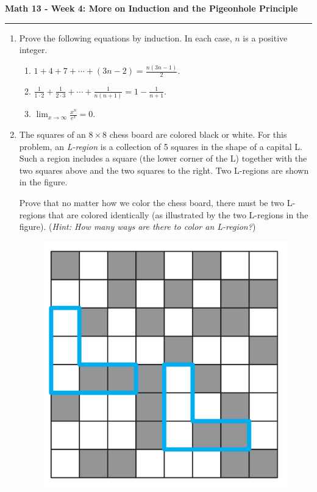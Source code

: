 \documentclass[12pt]{report}
\theoremstyle{definition}
\begin{document}
\begin{center}
{\bf \Large Math 13 - Week 4: More on Induction and the Pigeonhole Principle}
\vspace{0.2cm}
\hrule
\end{center}

\begin{enumerate}	

\item Prove the following equations by induction. In each case, $n$ is a positive integer.
\begin{enumerate}
	\item $1 + 4 + 7 + \cdots + (3n-2) = \frac{n(3n-1)}{2}$.
	\item $\frac{1}{1\cdot 2} + \frac{1}{2\cdot 3} + \cdots + \frac{1}{n(n+1)} = 1-\frac{1}{n+1}$.
	\item $\lim_{x\to \infty}\frac{x^n}{e^x} = 0$.
\end{enumerate}
\vfill

\item The squares of an $8\times 8$ chess board are colored black or white. For this problem, an \textit{L-region} is a collection of 5 squares in the shape of a capital L. Such a region includes a square (the lower corner of the L) together with the two squares above and the two squares to the right. Two L-regions are shown in the figure.

Prove that no matter how we color the chess board, there must be two L-regions that are colored identically (as illustrated by the two L-regions in the figure). (\textit{Hint: How many ways are there to color an L-region?})

\begin{figure}[h]
\centering
\includegraphics[scale=.5]{board.PNG}
\end{figure}
\vfill


\end{enumerate}
\end{document}
